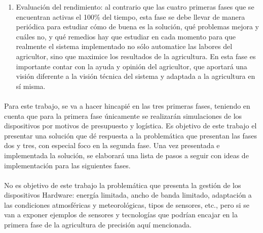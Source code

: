 \documentclass[../../memoria.tex]{subfiles}
\begin{document}
\begin{enumerate}
  \item  Evaluación del rendimiento: al contrario que las cuatro primeras fases que se encuentran activas el 100\% del tiempo, esta fase se debe llevar de manera periódica para estudiar cómo de buena es la solución, qué problemas mejora y cuáles no, y qué remedios hay que estudiar en cada momento para que realmente el sistema implementado no sólo automatice las labores del agricultor, sino que maximice los resultados de la agricultura. En esta fase es importante contar con la ayuda y opinión del agricultor, que aportará una visión diferente a la visión técnica del sistema y adaptada a la agricultura en sí misma.
\end{enumerate}

\paragraph{}
Para este trabajo, se va a hacer hincapié en las tres primeras fases, teniendo en cuenta que para la primera fase únicamente se realizarán simulaciones de los dispositivos por motivos de presupuesto y logística. Es objetivo de este trabajo el presentar una solución que dé respuesta a la problemática que presentan las fases dos y tres, con especial foco en la segunda fase. Una vez presentada e implementada la solución, se elaborará una lista de pasos a seguir con ideas de implementación para las siguientes fases.

\paragraph{}
No es objetivo de este trabajo la problemática que presenta la gestión de los dispositivos Hardware: energía limitada, ancho de banda limitado, adaptación a las condiciones atmosféricas y meteorológicas, tipos de sensores, etc., pero si se van a exponer ejemplos de sensores y tecnologías que podrían encajar en la primera fase de la agricultura de precisión aquí mencionada.
\end{document}

